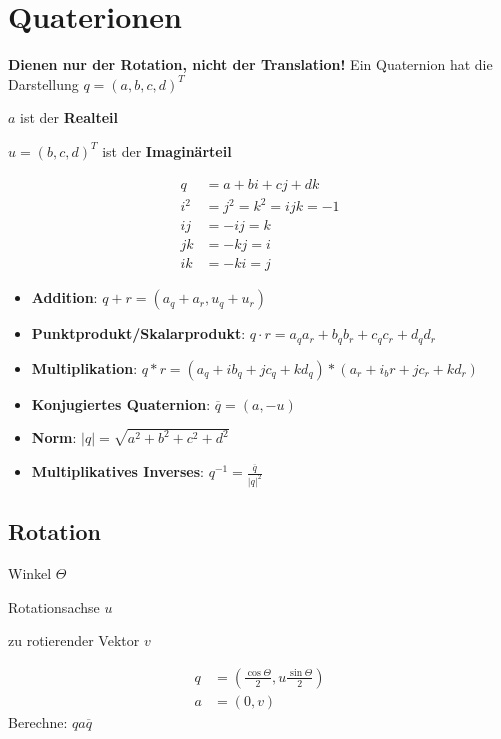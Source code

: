 \section{Quaterionen}
\textbf{Dienen nur der Rotation, nicht der Translation!}
Ein Quaternion hat die Darstellung $q = (a,b,c,d)^T$
\begin{compactitem}
    \item $a$ ist der \textbf{Realteil}
    \item $u = (b,c,d)^T$ ist der \textbf{Imaginärteil}
\end{compactitem}
\begin{align}
    q &= a + bi + cj + dk \\
    i^2 &= j^2 = k^2 = ijk = -1 \\
    ij &= -ij = k \\
    jk &= -kj = i \\
    ik &= -ki = j
\end{align}
\begin{itemize}
    \item \textbf{Addition}: $q + r = (a_q + a_r, u_q + u_r)$
    \item \textbf{Punktprodukt/Skalarprodukt}: $q \cdot r = a_qa_r +b_qb_r + c_qc_r + d_qd_r $
    \item \textbf{Multiplikation}: $q * r = (a_q + ib_q + jc_q + kd_q) * (a_r + i_br + jc_r + kd_r)$
    \item \textbf{Konjugiertes Quaternion}: $\overline{q} = (a,-u)$
    \item \textbf{Norm}: $|q| = \sqrt{a^2+b^2+c^2+d^2}$
    \item \textbf{Multiplikatives Inverses}: $q^{-1} = \frac{\overline{q}}{|q|^2}$
\end{itemize}

\subsection{Rotation}
\begin{compactitem}
    \item Winkel $\Theta$
    \item Rotationsachse $u$
    \item zu rotierender Vektor $v$
\end{compactitem}
\begin{align}
    q &= (\frac{\cos\Theta}{2},u\frac{\sin\Theta}{2})\\
    a &= (0,v)
\end{align}
Berechne: $qa\overline{q}$
